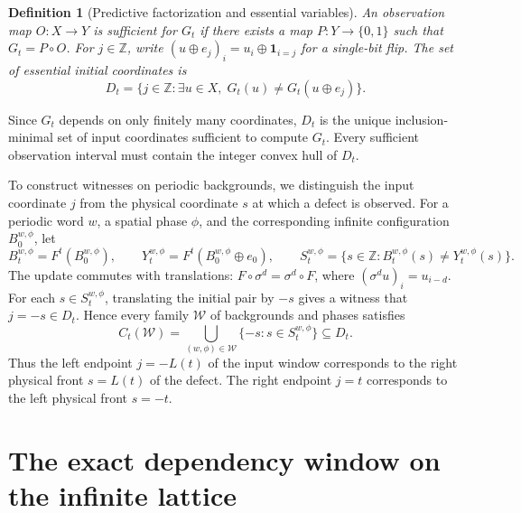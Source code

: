\documentclass[11pt, a4paper]{article}
\newtheorem{definition}[theorem]{Definition}
\begin{document}
\begin{definition}[Predictive factorization and essential variables]
An observation map $O : X \to Y$ is sufficient for $G_t$ if there exists a map $P : Y \to \{0, 1\}$ such that $G_t = P \circ O$. For $j \in \mathbb{Z}$, write $(u \oplus e_j)_i = u_i \oplus \mathbf{1}_{i=j}$ for a single-bit flip. The set of essential initial coordinates is
\begin{equation}\label{eq:essential_set}
D_t = \{ j \in \mathbb{Z} : \exists u \in X,\; G_t(u) \ne G_t(u \oplus e_j) \}.
\end{equation}
\end{definition}

Since $G_t$ depends on only finitely many coordinates, $D_t$ is the unique inclusion-minimal set of input coordinates sufficient to compute $G_t$. Every sufficient observation interval must contain the integer convex hull of $D_t$.

To construct witnesses on periodic backgrounds, we distinguish the input coordinate $j$ from the physical coordinate $s$ at which a defect is observed. For a periodic word $w$, a spatial phase $\phi$, and the corresponding infinite configuration $B_0^{w,\phi}$, let
\begin{equation}\label{eq:diff_support}
B_t^{w,\phi} = F^t(B_0^{w,\phi}), \qquad
Y_t^{w,\phi} = F^t(B_0^{w,\phi} \oplus e_0), \qquad
S_t^{w,\phi} = \{ s \in \mathbb{Z} : B_t^{w,\phi}(s) \ne Y_t^{w,\phi}(s) \}.
\end{equation}
The update commutes with translations: $F \circ \sigma^d = \sigma^d \circ F$, where $(\sigma^d u)_i = u_{i-d}$. For each $s \in S_t^{w,\phi}$, translating the initial pair by $-s$ gives a witness that $j = -s \in D_t$. Hence every family $\mathcal{W}$ of backgrounds and phases satisfies
\begin{equation}\label{eq:coverage_bridge}
C_t(\mathcal{W}) = \bigcup_{(w,\phi) \in \mathcal{W}} \{ -s : s \in S_t^{w,\phi} \} \subseteq D_t.
\end{equation}
Thus the left endpoint $j = -L(t)$ of the input window corresponds to the right physical front $s = L(t)$ of the defect. The right endpoint $j = t$ corresponds to the left physical front $s = -t$.

\section{The exact dependency window on the infinite lattice}
\end{document}
